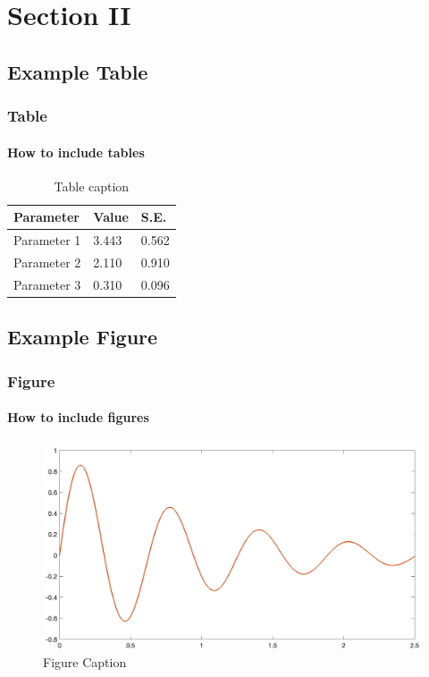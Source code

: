 \documentclass[
	11pt, %
]{beamer}
\begin{document}
\section{Section II}

\subsection{Example Table}

\begin{frame}
	\frametitle{Table}
	\framesubtitle{How to include tables} %
	
	\begin{table}
		\begin{tabular}{l l l}
			\toprule
			\textbf{Parameter} & \textbf{Value} & \textbf{S.E.}\\
			\midrule
			Parameter 1 & 3.443 & 0.562 \\
			Parameter 2 & 2.110 & 0.910 \\
			Parameter 3 & 0.310 & 0.096 \\
			\bottomrule
		\end{tabular}
		\caption{Table caption}
	\end{table}
\end{frame}

\subsection{Example Figure}

\begin{frame}
	\frametitle{Figure}
	\framesubtitle{How to include figures} %
	
	\begin{figure}
		\includegraphics[width=0.95\linewidth]{sample_fig.png}
		\caption{Figure Caption}
	\end{figure}
\end{frame}
\end{document}
